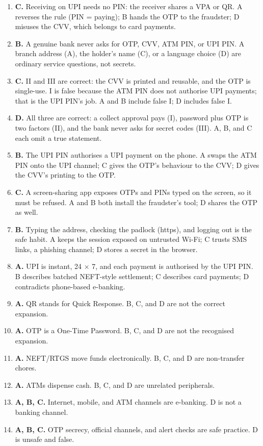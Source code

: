 \documentclass[11pt]{article}
\begin{document}
\begin{enumerate}[label=\textbf{Q\arabic*.}, leftmargin=*]
  so an unexpected ``refund'' request must be declined or ignored. A would
  pay the fraudster; B adds OTP-sharing to the loss; D spreads the fraud
  link.
\item \textbf{C.} Receiving on UPI needs no PIN: the receiver shares a VPA
  or QR. A reverses the rule (PIN = paying); B hands the OTP to the
  fraudster; D misuses the CVV, which belongs to card payments.
\item \textbf{B.} A genuine bank never asks for OTP, CVV, ATM PIN, or UPI
  PIN. A branch address (A), the holder's name (C), or a language choice
  (D) are ordinary service questions, not secrets.
\item \textbf{C.} II and III are correct: the CVV is printed and reusable,
  and the OTP is single-use. I is false because the ATM PIN does not
  authorise UPI payments; that is the UPI PIN's job. A and B include false
  I; D includes false I.
\item \textbf{D.} All three are correct: a collect approval pays (I),
  password plus OTP is two factors (II), and the bank never asks for secret
  codes (III). A, B, and C each omit a true statement.
\item \textbf{B.} The UPI PIN authorises a UPI payment on the phone. A
  swaps the ATM PIN onto the UPI channel; C gives the OTP's behaviour to
  the CVV; D gives the CVV's printing to the OTP.
\item \textbf{C.} A screen-sharing app exposes OTPs and PINs typed on the
  screen, so it must be refused. A and B both install the fraudster's tool;
  D shares the OTP as well.
\item \textbf{B.} Typing the address, checking the padlock (https), and
  logging out is the safe habit. A keeps the session exposed on untrusted
  Wi-Fi; C trusts SMS links, a phishing channel; D stores a secret in the
  browser.
\item \textbf{A.} UPI is instant, 24 $\times$ 7, and each payment is
  authorised by the UPI PIN. B describes batched NEFT-style settlement; C
  describes card payments; D contradicts phone-based e-banking.
\item \textbf{A.} QR stands for Quick Response. B, C, and D are not the
  correct expansion.

\item \textbf{A.} OTP is a One-Time Password. B, C, and D are not the recognised expansion.
\item \textbf{A.} NEFT/RTGS move funds electronically. B, C, and D are non-transfer chores.
\item \textbf{A.} ATMs dispense cash. B, C, and D are unrelated peripherals.
\item \textbf{A, B, C.} Internet, mobile, and ATM channels are e-banking. D is not a banking channel.
\item \textbf{A, B, C.} OTP secrecy, official channels, and alert checks are safe practice. D is unsafe and false.
\end{enumerate}
\def\JKSSBLessonID{39}\def\JKSSBAnswers{1}
\end{document}
